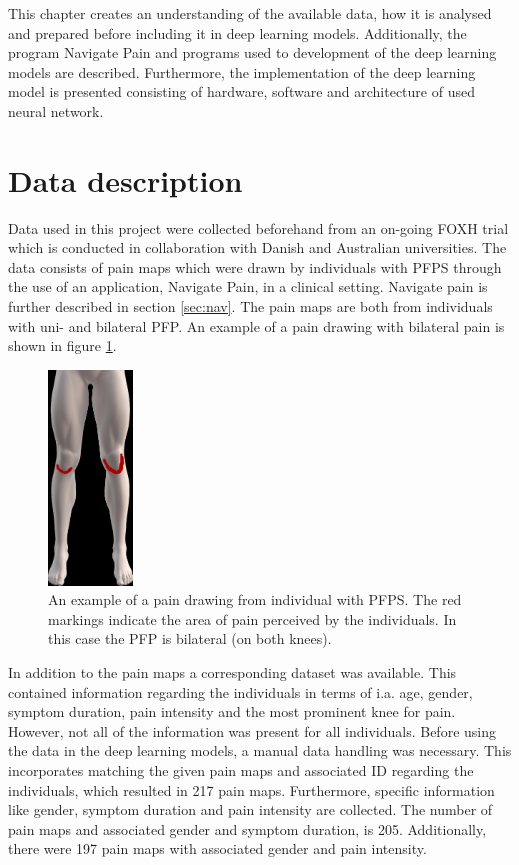 This chapter creates an understanding of the available data, how it is analysed and prepared before including it in deep learning models. Additionally, the program Navigate Pain and programs used to development of the deep learning models are described. Furthermore, the implementation of the deep learning model is presented consisting of hardware, software and architecture of used neural network.

\section{Data description}
Data used in this project were collected beforehand from an on-going FOXH trial which is conducted in collaboration with Danish and Australian universities. The data consists of pain maps which were drawn by individuals with PFPS through the use of an application, Navigate Pain, in a clinical setting. Navigate pain is further described in section \ref{sec:nav}. The pain maps are both from individuals with uni- and bilateral PFP. An example of a pain drawing with bilateral pain is shown in figure \ref{fig:kneepainmap}.

\begin{figure} [H]
\centering
\includegraphics[width=0.2\textwidth]{figures/kneepainmap}
\caption{An example of a pain drawing from individual with PFPS. The red markings indicate the area of pain perceived by the individuals. In this case the PFP is bilateral (on both knees).}
\label{fig:kneepainmap}
\end{figure}

\noindent
In addition to the pain maps a corresponding dataset was available. This contained information regarding the individuals in terms of i.a. age, gender, symptom duration, pain intensity and the most prominent knee for pain. However, not all of the information was present for all individuals.
Before using the data in the deep learning models, a manual data handling was necessary. This incorporates matching the given pain maps and associated ID regarding the individuals, which resulted in 217 pain maps. Furthermore, specific information like gender, symptom duration and pain intensity are collected. The number of pain maps and associated gender and symptom duration, is 205. Additionally, there were 197 pain maps with associated gender and pain intensity.


